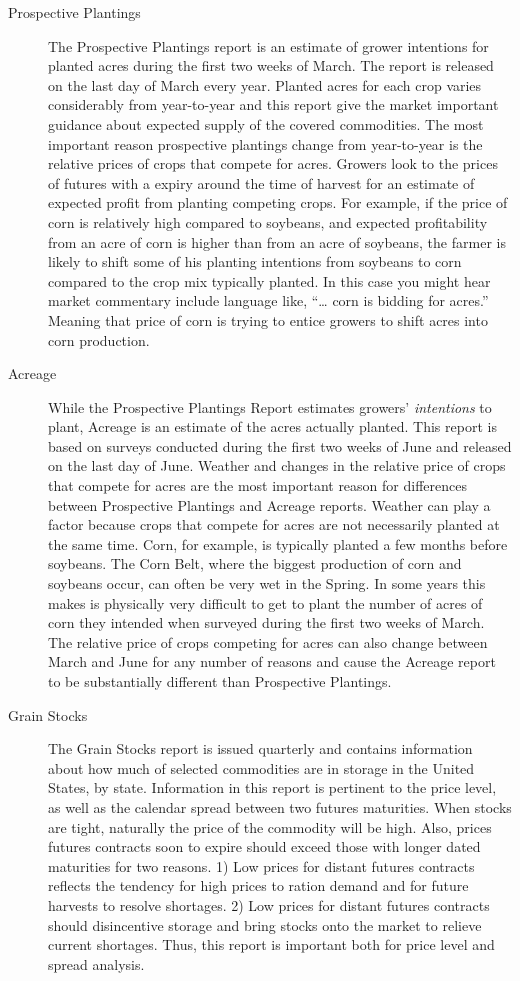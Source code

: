 \documentclass[
]{book}
\begin{document}
\begin{description}
\item[Prospective Plantings]
The Prospective Plantings report is an estimate of grower intentions for planted acres during the first two weeks of March. The report is released on the last day of March every year. Planted acres for each crop varies considerably from year-to-year and this report give the market important guidance about expected supply of the covered commodities. The most important reason prospective plantings change from year-to-year is the relative prices of crops that compete for acres. Growers look to the prices of futures with a expiry around the time of harvest for an estimate of expected profit from planting competing crops. For example, if the price of corn is relatively high compared to soybeans, and expected profitability from an acre of corn is higher than from an acre of soybeans, the farmer is likely to shift some of his planting intentions from soybeans to corn compared to the crop mix typically planted. In this case you might hear market commentary include language like, ``\ldots{} corn is bidding for acres.'' Meaning that price of corn is trying to entice growers to shift acres into corn production.
\item[Acreage]
While the Prospective Plantings Report estimates growers' \emph{intentions} to plant, Acreage is an estimate of the acres actually planted. This report is based on surveys conducted during the first two weeks of June and released on the last day of June. Weather and changes in the relative price of crops that compete for acres are the most important reason for differences between Prospective Plantings and Acreage reports. Weather can play a factor because crops that compete for acres are not necessarily planted at the same time. Corn, for example, is typically planted a few months before soybeans. The Corn Belt, where the biggest production of corn and soybeans occur, can often be very wet in the Spring. In some years this makes is physically very difficult to get to plant the number of acres of corn they intended when surveyed during the first two weeks of March. The relative price of crops competing for acres can also change between March and June for any number of reasons and cause the Acreage report to be substantially different than Prospective Plantings.
\item[Grain Stocks]
The Grain Stocks report is issued quarterly and contains information about how much of selected commodities are in storage in the United States, by state. Information in this report is pertinent to the price level, as well as the calendar spread between two futures maturities. When stocks are tight, naturally the price of the commodity will be high. Also, prices futures contracts soon to expire should exceed those with longer dated maturities for two reasons. 1) Low prices for distant futures contracts reflects the tendency for high prices to ration demand and for future harvests to resolve shortages. 2) Low prices for distant futures contracts should disincentive storage and bring stocks onto the market to relieve current shortages. Thus, this report is important both for price level and spread analysis.

\end{description}
\end{document}

